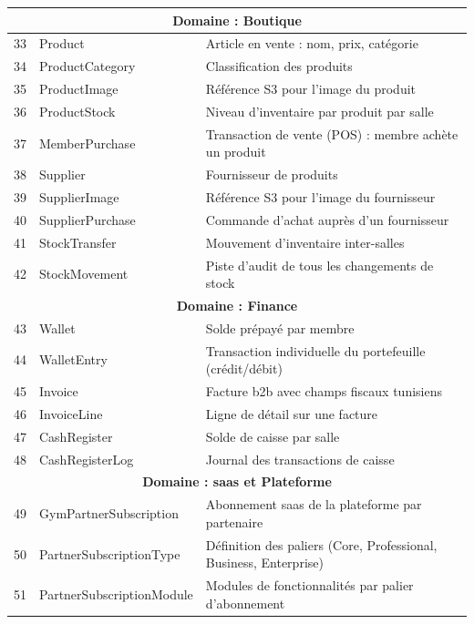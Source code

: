 \documentclass[../main.tex]{subfiles}
\begin{document}
\begin{longtable}{|c|>{\footnotesize}p{4.8cm}|p{7.5cm}|}
\multicolumn{3}{|c|}{\textbf{Domaine : Boutique}} \\
\hline
33 & Product & Article en vente : nom, prix, cat\'{e}gorie \\
\hline
34 & ProductCategory & Classification des produits \\
\hline
35 & ProductImage & R\'{e}f\'{e}rence S3 pour l'image du produit \\
\hline
36 & ProductStock & Niveau d'inventaire par produit par salle \\
\hline
37 & MemberPurchase & Transaction de vente (POS) : membre achète un produit \\
\hline
38 & Supplier & Fournisseur de produits \\
\hline
39 & SupplierImage & R\'{e}f\'{e}rence S3 pour l'image du fournisseur \\
\hline
40 & SupplierPurchase & Commande d'achat aupr\`{e}s d'un fournisseur \\
\hline
41 & StockTransfer & Mouvement d'inventaire inter-salles \\
\hline
42 & StockMovement & Piste d'audit de tous les changements de stock \\
\hline

\multicolumn{3}{|c|}{\textbf{Domaine : Finance}} \\
\hline
43 & Wallet & Solde pr\'{e}pay\'{e} par membre \\
\hline
44 & WalletEntry & Transaction individuelle du portefeuille (cr\'{e}dit/d\'{e}bit) \\
\hline
45 & Invoice & Facture \acrshort{b2b} avec champs fiscaux tunisiens \\
\hline
46 & InvoiceLine & Ligne de d\'{e}tail sur une facture \\
\hline
47 & CashRegister & Solde de caisse par salle \\
\hline
48 & CashRegisterLog & Journal des transactions de caisse \\
\hline

\multicolumn{3}{|c|}{\textbf{Domaine : \acrshort{saas} et Plateforme}} \\
\hline
49 & GymPartnerSubscription & Abonnement \acrshort{saas} de la plateforme par partenaire \\
\hline
50 & PartnerSubscriptionType & D\'{e}finition des paliers (Core, Professional, Business, Enterprise) \\
\hline
51 & PartnerSubscriptionModule & Modules de fonctionnalit\'{e}s par palier d'abonnement \\
\hline


\end{longtable}
\end{document}
